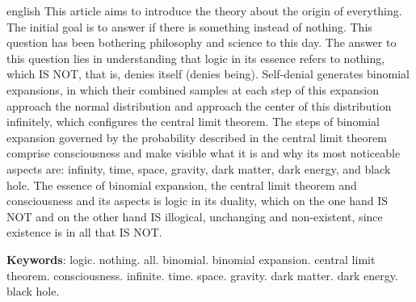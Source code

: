 \renewcommand{\resumoname}{Abstract}
\begin{resumoumacoluna}
 \begin{otherlanguage*}{english}
\vspace{-2mm}
	This article aims to introduce the theory about the origin of everything. The initial goal is to answer if there is something instead of nothing. This question has been bothering philosophy and science to this day. The answer to this question lies in understanding that logic in its essence refers to nothing, which IS NOT, that is, denies itself (denies being). Self-denial generates binomial expansions, in which their combined samples at each step of this expansion approach the normal distribution and approach the center of this distribution infinitely, which configures the central limit theorem. The steps of binomial expansion governed by the probability described in the central limit theorem comprise consciousness and make visible what it is and why its most noticeable aspects are: infinity, time, space, gravity, dark matter, dark energy, and black hole. The essence of binomial expansion, the central limit theorem and consciousness and its aspects is logic in its duality, which on the one hand IS NOT and on the other hand IS illogical, unchanging and non-existent, since existence is in all that IS NOT.
	\vspace{\onelineskip} 
	\noindent
	
	\textbf{Keywords}: logic. nothing. all. binomial. binomial expansion. central limit theorem. consciousness. infinite. time. space. gravity. dark matter. dark energy. black hole.
 \end{otherlanguage*}  
\end{resumoumacoluna}

